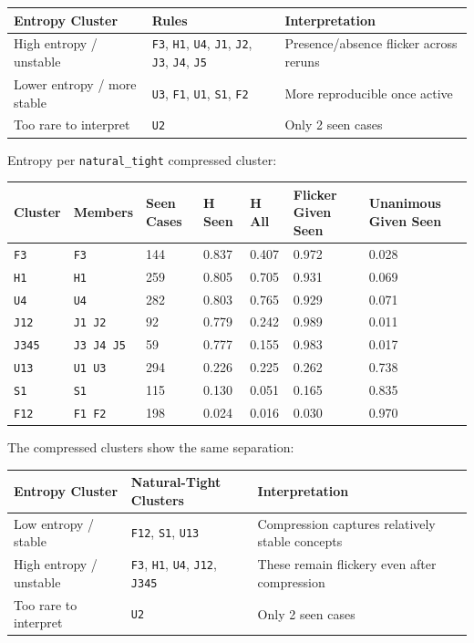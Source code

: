 \documentclass[11pt]{article}
\begin{document}
\begin{longtable}{L{0.24\textwidth} L{0.36\textwidth} L{0.30\textwidth}}
\toprule
Entropy Cluster & Rules & Interpretation \\
\midrule
\endhead
High entropy / unstable & \texttt{F3}, \texttt{H1}, \texttt{U4}, \texttt{J1}, \texttt{J2}, \texttt{J3}, \texttt{J4}, \texttt{J5} & Presence/absence flicker across reruns \\
Lower entropy / more stable & \texttt{U3}, \texttt{F1}, \texttt{U1}, \texttt{S1}, \texttt{F2} & More reproducible once active \\
Too rare to interpret & \texttt{U2} & Only 2 seen cases \\
\bottomrule
\end{longtable}

Entropy per \texttt{natural\_tight} compressed cluster:

\begingroup
\small
\begin{longtable}{L{0.10\textwidth} L{0.16\textwidth} R{0.10\textwidth} R{0.08\textwidth} R{0.08\textwidth} R{0.14\textwidth} R{0.15\textwidth}}
\toprule
Cluster & Members & Seen Cases & H Seen & H All & Flicker Given Seen & Unanimous Given Seen \\
\midrule
\endhead
\texttt{F3} & \texttt{F3} & 144 & 0.837 & 0.407 & 0.972 & 0.028 \\
\texttt{H1} & \texttt{H1} & 259 & 0.805 & 0.705 & 0.931 & 0.069 \\
\texttt{U4} & \texttt{U4} & 282 & 0.803 & 0.765 & 0.929 & 0.071 \\
\texttt{J12} & \texttt{J1 J2} & 92 & 0.779 & 0.242 & 0.989 & 0.011 \\
\texttt{J345} & \texttt{J3 J4 J5} & 59 & 0.777 & 0.155 & 0.983 & 0.017 \\
\texttt{U13} & \texttt{U1 U3} & 294 & 0.226 & 0.225 & 0.262 & 0.738 \\
\texttt{S1} & \texttt{S1} & 115 & 0.130 & 0.051 & 0.165 & 0.835 \\
\texttt{F12} & \texttt{F1 F2} & 198 & 0.024 & 0.016 & 0.030 & 0.970 \\
\bottomrule
\end{longtable}
\endgroup

The compressed clusters show the same separation:

\begin{longtable}{L{0.24\textwidth} L{0.32\textwidth} L{0.34\textwidth}}
\toprule
Entropy Cluster & Natural-Tight Clusters & Interpretation \\
\midrule
\endhead
Low entropy / stable & \texttt{F12}, \texttt{S1}, \texttt{U13} & Compression captures relatively stable concepts \\
High entropy / unstable & \texttt{F3}, \texttt{H1}, \texttt{U4}, \texttt{J12}, \texttt{J345} & These remain flickery even after compression \\
Too rare to interpret & \texttt{U2} & Only 2 seen cases \\
\bottomrule
\end{longtable}
\end{document}
